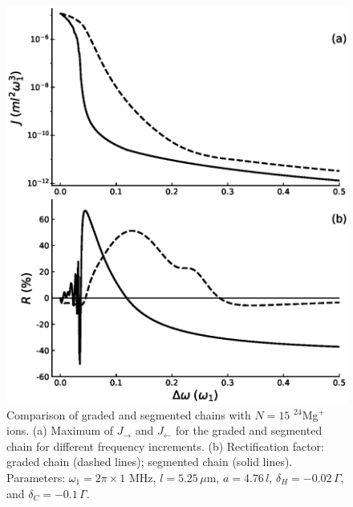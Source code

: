 \begin{figure}[t]
    \includegraphics[width=\linewidth]{Figures/24Mg_Comparacion_Graded_AND_Segmented.eps}
    \caption{Comparison of graded and segmented chains with $N=15$ $^{24}$Mg$^+$ ions. (a) Maximum
    of $J_\rightarrow$ and $J_\leftarrow$
     for the graded and segmented chain for different frequency increments. (b) Rectification factor: graded chain (dashed lines); segmented chain (solid lines). Parameters: $\omega_1 = 2 \pi \times 1$ MHz, $l = 5.25\,\mu$m, $a = 4.76 \, l$, $\delta_H = -0.02 \, \Gamma$, and $\delta_C = -0.1 \, \Gamma$.}
    \label{fig:GS}
\end{figure}





